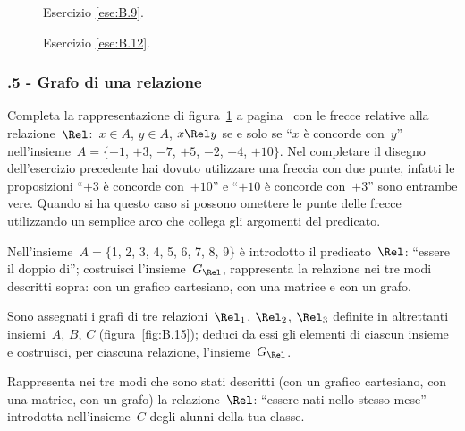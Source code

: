 \begin{figure}[b]
\begin{minipage}[b]{.45\textwidth}
 \centering
 
 \caption{Esercizio \ref{ese:B.9}.}\label{fig:B.13}
\end{minipage}\hfil
\begin{minipage}[b]{.45\textwidth}
 \centering
 
 \caption{Esercizio \ref{ese:B.12}.}\label{fig:B.14}
\end{minipage}
\end{figure}
\begin{multicols}{2}

\subsubsection*{\thechapter.5 - Grafo di una relazione}

\begin{esercizio}
\label{ese:B.12}
Completa la rappresentazione di figura~\ref{fig:B.14} a pagina~\pageref{fig:B.14} con le frecce relative alla relazione~$\Rel$:~$x \in A$, $y \in A$, $x \Rel y$ se e solo se ``$x$ è concorde con~$y$''
nell'insieme~$A =\{-1$, $+3$, $-7$, $+5$, $-2$, $+4$, $+10\}$.
\osservazione Nel completare il disegno dell'esercizio precedente hai dovuto utilizzare una freccia con due punte, infatti le proposizioni
``$+3$ è concorde con~$+10$'' e ``$+10$ è concorde con~$+3$'' sono entrambe vere. Quando si ha questo caso si possono omettere le punte
delle frecce utilizzando un semplice arco che collega gli argomenti del predicato.
\end{esercizio}

\begin{esercizio}
\label{ese:B.13}
Nell'insieme~$A = \{$1, 2, 3, 4, 5, 6, 7, 8, 9$\}$ è introdotto il predicato~$\Rel$: ``essere il
doppio di''; costruisci l'insieme~$G_\Rel$, rappresenta la relazione nei tre modi descritti sopra: con un grafico cartesiano,
con una matrice e con un grafo.
\end{esercizio}

\begin{esercizio}
\label{ese:B.14}
Sono assegnati i grafi di tre relazioni~$\Rel_1$, $\Rel_2$, $\Rel_3$ definite in altrettanti insiemi~$A$, $B$, $C$ (figura~\ref{fig:B.15}); deduci da essi gli elementi di ciascun
insieme e costruisci, per ciascuna relazione, l'insieme~$G_\Rel$.
\end{esercizio}

\begin{esercizio}
\label{ese:B.15}
Rappresenta nei tre modi che sono stati descritti (con un grafico cartesiano, con una matrice, con un
grafo) la relazione~$\Rel$: ``essere nati nello stesso mese'' introdotta nell'insieme~$C$ degli alunni della tua classe.
\end{esercizio}


\end{multicols}
